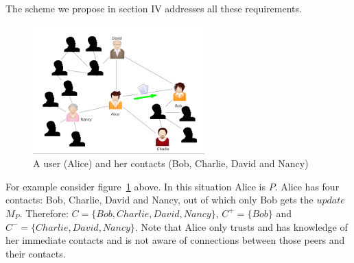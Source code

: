 The scheme we propose in section IV addresses all these requirements.

\begin{figure}[here]
\includegraphics{img/img1.png} 
\caption{A user (Alice) and her contacts (Bob, Charlie, David and Nancy)}
\label{fig:fig1}
\end{figure}

For example consider figure~\ref{fig:fig1} above. In this situation Alice is $P$. Alice has four contacts: Bob, Charlie, David and Nancy, out of which only Bob gets the $update$ $M_P$. Therefore: $C = \{Bob, Charlie, David,Nancy\}$, ${C^+ = \{Bob\}}$ and ${C^- = \{Charlie, David,Nancy\}}$. Note that Alice only trusts and has knowledge of her immediate contacts and is not aware of connections between those peers and their contacts. 

